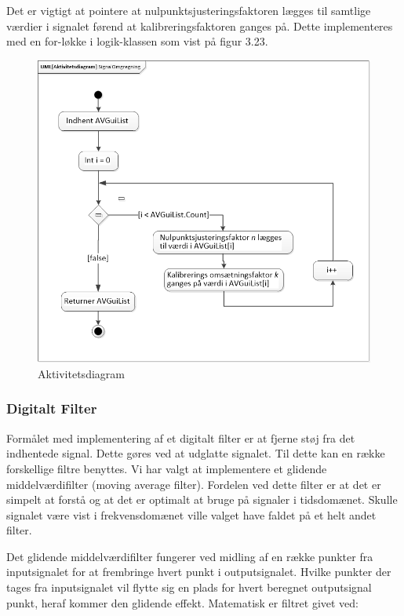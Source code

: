 Det er vigtigt at pointere at nulpunktsjusteringsfaktoren lægges til samtlige værdier i signalet førend at kalibreringsfaktoren ganges på. Dette implementeres med en for-løkke i logik-klassen som vist på figur 3.23.
\begin{figure}[H]
	\centering
	\includegraphics[width=1.0\textwidth]{Figurer/AktKaliNul}
	\caption{Aktivitetsdiagram}
\end{figure}

\subsubsection{Digitalt Filter}
Formålet med implementering af et digitalt filter er at fjerne støj fra det indhentede signal. Dette gøres ved at udglatte signalet. Til dette kan en række forskellige filtre benyttes. Vi har valgt at implementere et glidende middelværdifilter (moving average filter). Fordelen ved dette filter er at det er simpelt at forstå og at det er optimalt at bruge på signaler i tidsdomænet. Skulle signalet være vist i frekvensdomænet ville valget have faldet på et helt andet filter. 

Det glidende middelværdifilter fungerer ved midling af en række punkter fra inputsignalet for at frembringe hvert punkt i outputsignalet. Hvilke punkter der tages fra inputsignalet vil flytte sig en plads for hvert beregnet outputsignal punkt, heraf kommer den glidende effekt. Matematisk er filtret givet ved:

